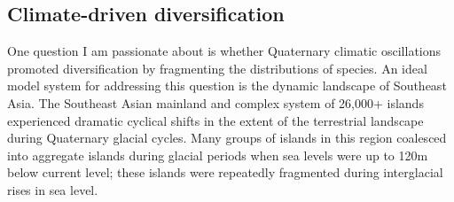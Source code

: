 
\subsection*{Climate-driven diversification}
One question I am passionate about is whether Quaternary climatic oscillations
promoted diversification by fragmenting the distributions of species.
An ideal model system for addressing this question is the dynamic landscape of
Southeast Asia.
The Southeast Asian mainland and complex system of 26,000+ islands experienced
dramatic cyclical shifts in the extent of the terrestrial landscape during
Quaternary glacial cycles.
Many groups of islands in this region coalesced into aggregate islands during
glacial periods when sea levels were up to 120m below current level; these
islands were repeatedly fragmented during interglacial rises in sea level.


